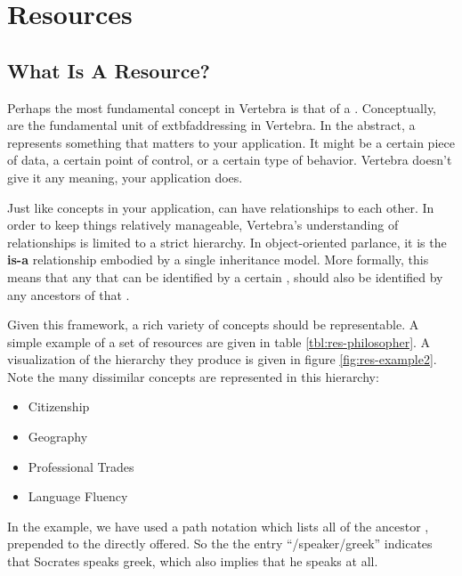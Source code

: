 \section{Resources}


\subsection{What Is A Resource?}

\label{ref:define-resource}

Perhaps the most fundamental concept in Vertebra is that of a \resource{}.  Conceptually, \resources{} are the fundamental unit of         extbf{addressing} in Vertebra.  In the abstract, a \resource{} represents something that matters to your application.  It might be a certain piece of data, a certain point of control, or a certain type of behavior.  Vertebra doesn't give it any meaning, your application does.

Just like concepts in your application, \resources{} can have relationships to each other.  In order to keep things relatively manageable, Vertebra's understanding of relationships is limited to a strict hierarchy.  In object-oriented parlance, it is the {\bf is-a} relationship embodied by a single inheritance model.  More formally, this means that any \agent{} that can be identified by a certain \resource, should also be identified by any ancestors of that \resource{}.

Given this framework, a rich variety of concepts should be representable.  A simple example of a set of resources are given in table \ref{tbl:res-philosopher}.  A visualization of the hierarchy they produce is given in figure \ref{fig:res-example2}.  Note the many dissimilar concepts are represented in this \resource{} hierarchy:

\begin{itemize}
        \item Citizenship
        \item Geography
        \item Professional Trades
        \item Language Fluency
\end{itemize}

In the example, we have used a path notation which lists all of the ancestor \resources{}, prepended to the \resource{} directly offered.  So the the entry ``{\sf/speaker/greek}'' indicates that Socrates speaks greek, which also implies that he speaks at all.

